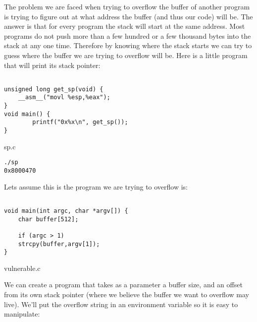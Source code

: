 \documentclass[a4paper]{article}
\begin{document}
The problem we are faced when trying to overflow the buffer of another program is trying to figure out at what address the buffer (and thus our code) will be. The answer is that for every program the stack will start at the same address. Most programs do not push more than a few hundred or a few thousand bytes into the stack at any one time. Therefore by knowing where the stack starts we can try to guess where the buffer we are trying to overflow will be. Here is a little program that will print its stack pointer:


\begin{listing}[H]
\begin{verbatim}

unsigned long get_sp(void) {
   	__asm__("movl %esp,%eax");
}
void main() {
 		printf("0x%x\n", get_sp());
}

\end{verbatim}
\caption{sp.c}
\label{listing:1}
\end{listing}

\begin{lstlisting}[style=DOS]
./sp
0x8000470
\end{lstlisting}

Lets assume this is the program we are trying to overflow is:

\begin{listing}[H]
\begin{verbatim}

void main(int argc, char *argv[]) {
	char buffer[512];

	if (argc > 1)
	strcpy(buffer,argv[1]);
}

\end{verbatim}
\caption{vulnerable.c}
\label{listing:1}
\end{listing}

We can create a program that takes as a parameter a buffer size, and an offset from its own stack pointer (where we believe the buffer we want to overflow may live). We’ll put the overflow string in an environment variable so it is easy to manipulate:
\end{document}
